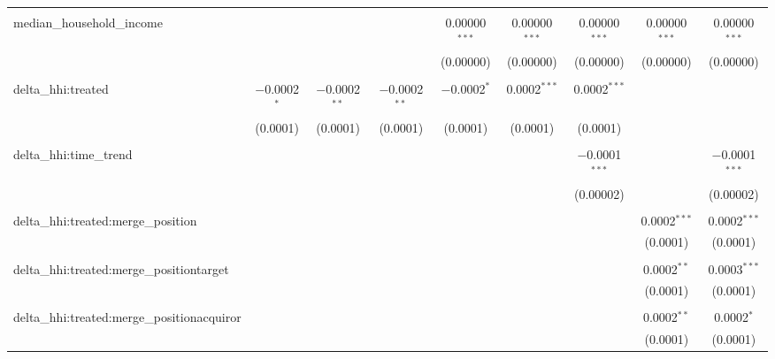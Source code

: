 \begin{table}[H]
{\begin{tabular}{@{\extracolsep{5pt}}lcccccccc}
   & & & & & & & & \\  

  median\_household\_income &  &  &  & 0.00000$^{***}$ & 0.00000$^{***}$ & 0.00000$^{***}$ & 0.00000$^{***}$ & 0.00000$^{***}$ \\  

   &  &  &  & (0.00000) & (0.00000) & (0.00000) & (0.00000) & (0.00000) \\  

   & & & & & & & & \\  

  delta\_hhi:treated & $-$0.0002$^{*}$ & $-$0.0002$^{**}$ & $-$0.0002$^{**}$ & $-$0.0002$^{*}$ & 0.0002$^{***}$ & 0.0002$^{***}$ &  &  \\  

   & (0.0001) & (0.0001) & (0.0001) & (0.0001) & (0.0001) & (0.0001) &  &  \\  

   & & & & & & & & \\  

  delta\_hhi:time\_trend &  &  &  &  &  & $-$0.0001$^{***}$ &  & $-$0.0001$^{***}$ \\  

   &  &  &  &  &  & (0.00002) &  & (0.00002) \\  

   & & & & & & & & \\  

  delta\_hhi:treated:merge\_position &  &  &  &  &  &  & 0.0002$^{***}$ & 0.0002$^{***}$ \\  

   &  &  &  &  &  &  & (0.0001) & (0.0001) \\  

   & & & & & & & & \\  

  delta\_hhi:treated:merge\_positiontarget &  &  &  &  &  &  & 0.0002$^{**}$ & 0.0003$^{***}$ \\  

   &  &  &  &  &  &  & (0.0001) & (0.0001) \\  

   & & & & & & & & \\  

  delta\_hhi:treated:merge\_positionacquiror &  &  &  &  &  &  & 0.0002$^{**}$ & 0.0002$^{*}$ \\  

   &  &  &  &  &  &  & (0.0001) & (0.0001) \\  


\end{tabular}}
\end{table}
